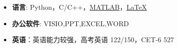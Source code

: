   \begin{itemize}[leftmargin=*]
    \item \textbf{语言}: Python，C/C++，\href{https://www.mathworks.com/}{MATLAB}，\href{https://www.latex-project.org/}{\LaTeX}
    \item \textbf{办公软件}: VISIO,PPT,EXCEL,WORD
    \item \textbf{英语}：英语能力较强，高考英语 122/150，CET-6 527
  \end{itemize}